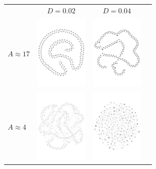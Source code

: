 \documentclass[a1paper,portrait,showframe,fontscale=.45]{baposter}
\begin{document}
\begin{poster}
{\begin{multicols}{2}
		    \begin{center}
			\begin{tabular}{lccc}
			    &$D=0.02$ & $D=0.04$\\
			    $A\approx17$&
			    \includegraphics[width=2.5cm]{img/g02.pdf}&
			    \includegraphics[width=2.5cm]{img/g00.pdf}\\
			    $A\approx4$&
			    \includegraphics[width=2.5cm]{img/g42.pdf}&
			    \includegraphics[width=2.5cm]{img/g40.pdf}\\
			\end{tabular}

		    \end{center}

			
		    

\end{multicols}}
\end{poster}
\end{document}
